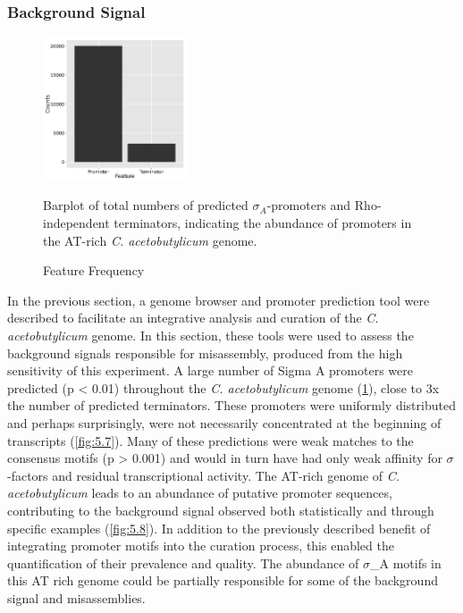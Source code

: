 


\subsubsection{Background Signal}
\begin{figure}
\small
\vspace{-20pt}
\begin{center}
\includegraphics[width=0.38\textwidth]{images/Assembly/Background_signal/prediction_frequency.png}
\caption{Feature Frequency}\label{fig:5.6}
Barplot of total numbers of predicted $\sigma_{A}$-promoters and Rho-independent terminators, indicating the abundance of promoters in the AT-rich \textit{C. acetobutylicum} genome.
\end{center}
\vspace{-20pt}

\end{figure}

In the previous section, a genome browser and promoter prediction tool were described to facilitate an integrative analysis and curation of the \textit{C. acetobutylicum} genome. In this section, these tools were used to assess the background signals responsible for misassembly, produced from the high sensitivity of this experiment. A large number of Sigma A promoters were predicted (p < 0.01) throughout the \textit{C. acetobutylicum} genome (\ref{fig:5.6}), close to 3x the number of predicted terminators. These promoters were uniformly distributed and perhaps surprisingly, were not necessarily concentrated at the beginning of transcripts (\ref{fig:5.7}). Many of these predictions were weak matches to the consensus motifs (p > 0.001) and would in turn have had only weak affinity for $\sigma$-factors and residual transcriptional activity. The AT-rich genome of \textit{C. acetobutylicum} leads to an abundance of putative promoter sequences, contributing to the background signal observed both statistically and through specific examples (\ref{fig:5.8}). In addition to the previously described benefit of integrating promoter motifs into the curation process, this enabled the quantification of their prevalence and quality. The abundance of $\sigma$_{A} motifs in this AT rich genome could be partially responsible for some of the background signal and misassemblies.

